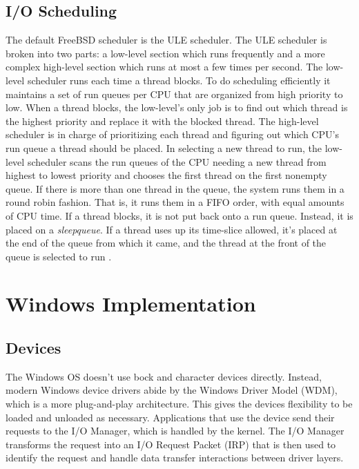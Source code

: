 \documentclass[onecolumn,draftclsnofoot, 10pt, compsoc]{IEEEtran}
\begin{document}
		\subsection{I/O Scheduling}
			The default FreeBSD scheduler is the ULE scheduler.
			The ULE scheduler is broken into two parts: a low-level section which runs frequently and a more complex high-level section which runs at most a few times per second.
			The low-level scheduler runs each time a thread blocks.
			To do scheduling efficiently it maintains a set of run queues per CPU that are organized from high priority to low.
			When a thread blocks, the low-level's only job is to find out which thread is the highest priority and replace it with the blocked thread. 
			The high-level scheduler is in charge of prioritizing each thread and figuring out which CPU's run queue a thread should be placed.
			In selecting a new thread to run, the low-level scheduler scans the run queues of the CPU needing a new thread from highest to lowest priority and chooses the first thread on the first nonempty queue.
			If there is more than one thread in the queue, the system runs them in a round robin fashion. 
			That is, it runs them in a FIFO order, with equal amounts of CPU time. 
			If a thread blocks, it is not put back onto a run queue. 
			Instead, it is placed on a \textit{sleepqueue}. 
			If a thread uses up its time-slice allowed, it's placed at the end of the queue from which it came, and the thread at the front of the queue is selected to run \cite{freeBSDScheduler}.

	
\section{Windows Implementation}

	\subsection{Devices}
		The Windows OS doesn't use bock and character devices directly.
		Instead, modern Windows device drivers abide by the Windows Driver Model (WDM), which is a more plug-and-play architecture.
		This gives the devices flexibility to be loaded and unloaded as necessary. 
		Applications that use the device send their requests to the I/O Manager, which is handled by the kernel.
		The I/O Manager transforms the request into an I/O Request Packet (IRP) that is then used to identify the request and handle data transfer interactions between driver layers.
		
\end{document}
